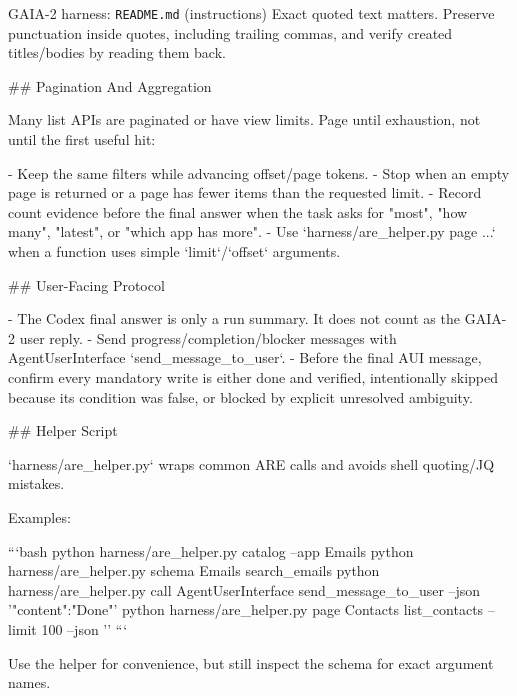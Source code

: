 \begin{promptbox}{GAIA-2 harness: \texttt{README.md} (instructions)}
Exact quoted text matters. Preserve punctuation inside quotes, including trailing commas, and verify created titles/bodies by reading them back.

## Pagination And Aggregation

Many list APIs are paginated or have view limits. Page until exhaustion, not until the first useful hit:

- Keep the same filters while advancing offset/page tokens.
- Stop when an empty page is returned or a page has fewer items than the requested limit.
- Record count evidence before the final answer when the task asks for "most", "how many", "latest", or "which app has more".
- Use `harness/are_helper.py page ...` when a function uses simple `limit`/`offset` arguments.

## User-Facing Protocol

- The Codex final answer is only a run summary. It does not count as the GAIA-2 user reply.
- Send progress/completion/blocker messages with AgentUserInterface `send_message_to_user`.
- Before the final AUI message, confirm every mandatory write is either done and verified, intentionally skipped because its condition was false, or blocked by explicit unresolved ambiguity.

## Helper Script

`harness/are_helper.py` wraps common ARE calls and avoids shell quoting/JQ mistakes.

Examples:

```bash
python harness/are_helper.py catalog --app Emails
python harness/are_helper.py schema Emails search_emails
python harness/are_helper.py call AgentUserInterface send_message_to_user --json '{"content":"Done"}'
python harness/are_helper.py page Contacts list_contacts --limit 100 --json '{}'
```

Use the helper for convenience, but still inspect the schema for exact argument names.
\end{promptbox}

